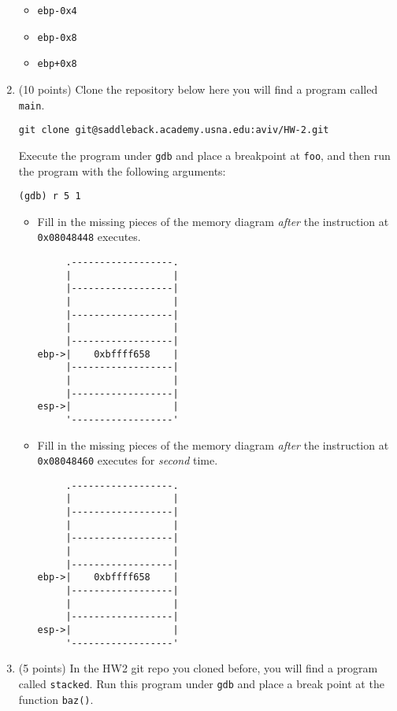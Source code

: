 \documentclass{article}[9pt]
\begin{document}
\begin{enumerate}
\begin{itemize}
\item \texttt{ebp-0x4}
\item \texttt{ebp-0x8}
\item \texttt{ebp+0x8}
\end{itemize}

\item (10 points) Clone the repository below here you will find a program called \texttt{main}.
\begin{verbatim}
git clone git@saddleback.academy.usna.edu:aviv/HW-2.git
\end{verbatim}
Execute the program under \texttt{gdb} and place a breakpoint at \texttt{foo},
and then run the program with the following arguments:
\begin{verbatim}
(gdb) r 5 1
\end{verbatim}

\begin{itemize}
\item Fill in the missing pieces of the memory diagram \emph{after} the
instruction at \texttt{0x08048448} executes.
\begin{verbatim}
     .------------------.
     |                  |
     |------------------|
     |                  |
     |------------------|
     |                  |
     |------------------|
ebp->|    0xbffff658    |
     |------------------|
     |                  | 
     |------------------|
esp->|                  |
     '------------------'
\end{verbatim}

\item Fill in the missing pieces of the memory diagram \emph{after} the
instruction at \texttt{0x08048460} executes for \emph{second} time.

\begin{verbatim}
     .------------------.
     |                  |
     |------------------|
     |                  |
     |------------------|
     |                  |
     |------------------|
ebp->|    0xbffff658    |
     |------------------|
     |                  | 
     |------------------|
esp->|                  |
     '------------------'
\end{verbatim}
\end{itemize}

\item (5 points) In the HW2 git repo you cloned before, you will find a program
called \texttt{stacked}. Run this program under \texttt{gdb} and place a break
point at the function \texttt{baz()}.


\end{enumerate}
\end{document}
